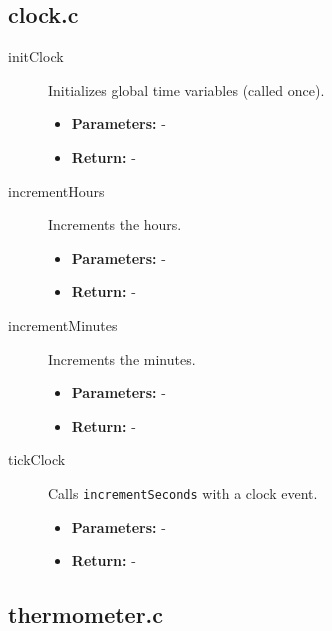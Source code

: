 \documentclass[a4paper,12pt]{article}
\begin{document}
\subsection{clock.c}

\begin{description}
    \item[initClock] Initializes global time variables (called once).
    \begin{itemize}
        \item \textbf{Parameters:} -
        \item \textbf{Return:} -
    \end{itemize}
    
    \item[incrementHours] Increments the hours.
    \begin{itemize}
        \item \textbf{Parameters:} -
        \item \textbf{Return:} -
    \end{itemize}
    
    \item[incrementMinutes] Increments the minutes.
    \begin{itemize}
        \item \textbf{Parameters:} -
        \item \textbf{Return:} -
    \end{itemize}
    
    \item[tickClock] Calls \texttt{incrementSeconds} with a clock event.
    \begin{itemize}
        \item \textbf{Parameters:} -
        \item \textbf{Return:} -
    \end{itemize}
\end{description}

\subsection{thermometer.c}
\end{document}
